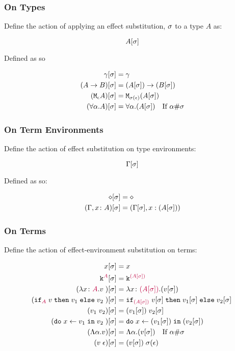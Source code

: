 \documentclass{report}
\begin{document}
        \subsubsection{On Types}
            
            Define the action of applying an effect substitution, $\sigma$ to a type $A$ as:

            $$A[\sigma]$$

            Defined as so

            \begin{align*}
                \gamma[\sigma] &= \gamma \\
                (A\rightarrow B)[\sigma] &= (A[\sigma])\rightarrow (B[\sigma]) \\
                (\texttt{M}_{\epsilon}{A})[\sigma] &= \texttt{M}_{\sigma(\epsilon)}{(A[\sigma])}\\
                (\forall \alpha. A)[\sigma] &= \forall \alpha. (A[\sigma])\quad\text{If $\alpha\#\sigma$}
            \end{align*}

        \subsubsection{On Term Environments}
            

            Define the action of effect substitution on type environments:
                    
            $$\Gamma[\sigma]$$
                    
            Defined as so:
                    
            \begin{align*}
                \diamond[\sigma] & = \diamond \\
                (\Gamma, x\colon A)[\sigma] &= (\Gamma[\sigma], x:(A[\sigma]))\\
            \end{align*}

        \subsubsection{On Terms}
            Define the action of effect-environment substitution on terms:

            \begin{align*}
                x[\sigma] & = x \\
                \texttt{k}^{\color{purple} A}[\sigma] & = \texttt{k}^{\color{purple} (A[\sigma])} \\
                (\lambda x \colon {\color{purple}A}. v\;)[\sigma] &= \lambda x \colon {\color{purple}(A[\sigma])}. (v[\sigma])\;\\
                (\texttt{if}_{\textcolor{purple}{A}}\; v\; \texttt{then}\; v_1 \;\texttt{else} \; v_2\;)[\sigma] &= \texttt{if}_{\textcolor{purple}{(A[\sigma])}}\; v[\sigma]\; \texttt{then}\; v_1[\sigma] \;\texttt{else} \; v_2[\sigma]\;\\
                (v_1\; v_2)[\sigma]&= (v_1[\sigma])\; v_2[\sigma]\\
                (\texttt{do}\; x \leftarrow v_1 \;\texttt{in}\; v_2\;)[\sigma]&= \texttt{do}\; x \leftarrow (v_1[\sigma]) \;\texttt{in}\; (v_2[\sigma])\;\\
                (\Lambda \alpha. v)[\sigma] & = \Lambda \alpha. (v[\sigma])\quad\text{If $\alpha\#\sigma$}\\
                (v\;\epsilon)[\sigma] & = (v[\sigma])\;\sigma(\epsilon)\\
            \end{align*}
\end{document}
